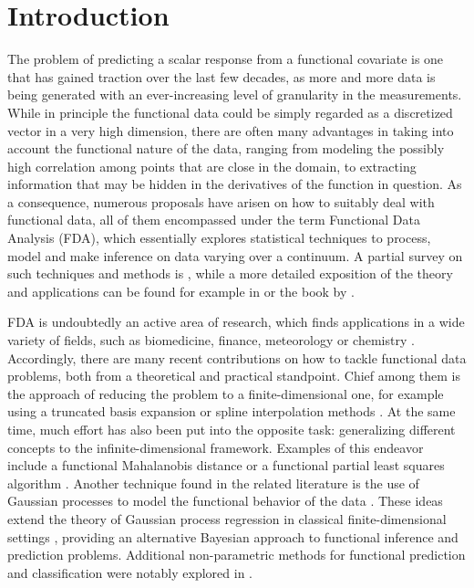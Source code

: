 \documentclass[ba]{imsart}
\numberwithin{equation}{section}
\theoremstyle{plain}
\begin{document}
\section{Introduction}\label{sec:intro}

The problem of predicting a scalar response from a functional covariate is one that has gained traction over the last few decades, as more and more data is being generated with an ever-increasing level of granularity in the measurements. While in principle the functional data could be simply regarded as a discretized vector in a very high dimension, there are often many advantages in taking into account the functional nature of the data, ranging from modeling the possibly high correlation among points that are close in the domain, to extracting information that may be hidden in the derivatives of the function in question. As a consequence, numerous proposals have arisen on how to suitably deal with functional data, all of them encompassed under the term Functional Data Analysis (FDA), which essentially explores statistical techniques to process, model and make inference on data varying over a continuum. A partial survey on such techniques and methods is \citet{cuevas2014partial}, while a more detailed exposition of the theory and applications can be found for example in \citet{hsing2015theoretical} or the book by \citet{horvath2012inference}.

FDA is undoubtedly an active area of research, which finds applications in a wide variety of fields, such as biomedicine, finance, meteorology or chemistry \citep[see for example][]{ullah2013applications}. Accordingly, there are many recent contributions on how to tackle functional data problems, both from a theoretical and practical standpoint. Chief among them is the approach of reducing the problem to a finite-dimensional one, for example using a truncated basis expansion or spline interpolation methods \citep[e.g.][]{muller2005generalized, aguilera2013comparative}. At the same time, much effort has also been put into the opposite task: generalizing different concepts to the infinite-dimensional framework. Examples of this endeavor include a functional Mahalanobis distance \citep{berrendero2020mahalanobis} or a functional partial least squares algorithm \citep{delaigle2012methodology}. Another technique found in the related literature is the use of Gaussian processes to model the functional behavior of the data \citep[see for instance][]{shi2011gaussian}. These ideas extend the theory of Gaussian process regression in classical finite-dimensional settings \citep{rasmussen2004gaussian}, providing an alternative Bayesian approach to functional inference and prediction problems. Additional non-parametric methods for functional prediction and classification were notably explored in \citet{ferraty2006nonparametric}.
\end{document}
